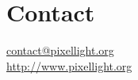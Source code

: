 \chapter{Contact}

\href{mailto:contact@pixellight.org}{contact@pixellight.org}\\
\url{http://www.pixellight.org}
